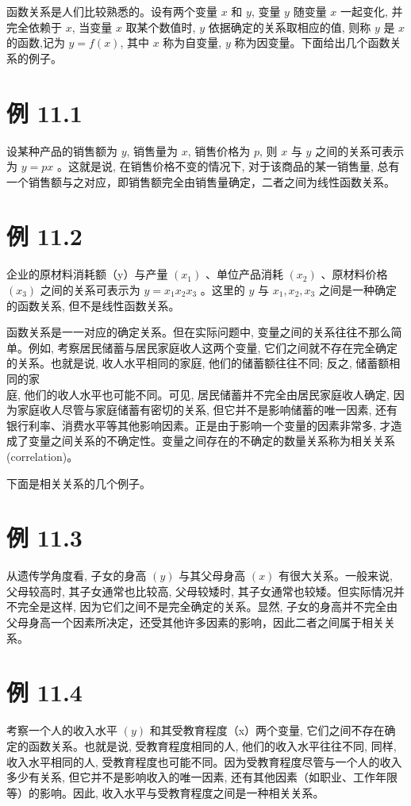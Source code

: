 \documentclass[10pt]{article}
\begin{document}
\begin{CJK*}{UTF8}{bsmi}
函数关系是人们比较熟悉的。设有两个变量 $x$ 和 $y$, 变量 $y$ 随变量 $x$ 一起变化, 并完全依赖于 $x$, 当变量 $x$ 取某个数值时, $y$ 依据确定的关系取相应的值, 则称 $y$ 是 $x$ 的函数,记为 $y=f(x)$, 其中 $x$ 称为自变量, $y$ 称为因变量。下面给出几个函数关系的例子。

\section*{例 11.1}
设某种产品的销售额为 $y$, 销售量为 $x$, 销售价格为 $p$, 则 $x$ 与 $y$ 之间的关系可表示为 $y=p x$ 。这就是说, 在销售价格不变的情况下, 对于该商品的某一销售量, 总有一个销售额与之对应，即销售额完全由销售量确定，二者之间为线性函数关系。

\section*{例 11.2}
企业的原材料消耗额（y）与产量 $\left(x_{1}\right)$ 、单位产品消耗 $\left(x_{2}\right)$ 、原材料价格 $\left(x_{3}\right)$ 之间的关系可表示为 $y=x_{1} x_{2} x_{3}$ 。这里的 $y$ 与 $x_{1}, x_{2}, x_{3}$ 之间是一种确定的函数关系, 但不是线性函数关系。

函数关系是一一对应的确定关系。但在实际问题中, 变量之间的关系往往不那么简单。例如, 考察居民储蓄与居民家庭收人这两个变量, 它们之间就不存在完全确定的关系。也就是说, 收人水平相同的家庭, 他们的储蓄额往往不同; 反之, 储蓄额相同的家\\
庭, 他们的收人水平也可能不同。可见, 居民储蓄并不完全由居民家庭收人确定, 因为家庭收人尽管与家庭储蓄有密切的关系, 但它并不是影响储蓄的唯一因素, 还有银行利率、消费水平等其他影响因素。正是由于影响一个变量的因素非常多, 才造成了变量之间关系的不确定性。变量之间存在的不确定的数量关系称为相关关系 (correlation)。

下面是相关关系的几个例子。

\section*{例 11.3}
从遗传学角度看, 子女的身高 $(y)$ 与其父母身高 $(x)$ 有很大关系。一般来说, 父母较高时, 其子女通常也比较高, 父母较矮时, 其子女通常也较矮。但实际情况并不完全是这样, 因为它们之间不是完全确定的关系。显然, 子女的身高并不完全由父母身高一个因素所决定，还受其他许多因素的影响，因此二者之间属于相关关系。

\section*{例 11.4}
考察一个人的收入水平 $(y)$ 和其受教育程度（x）两个变量, 它们之间不存在确定的函数关系。也就是说, 受教育程度相同的人, 他们的收入水平往往不同, 同样, 收入水平相同的人, 受教育程度也可能不同。因为受教育程度尽管与一个人的收入多少有关系, 但它并不是影响收入的唯一因素, 还有其他因素（如职业、工作年限等）的影响。因此, 收入水平与受教育程度之间是一种相关关系。


\end{CJK*}
\end{document}
